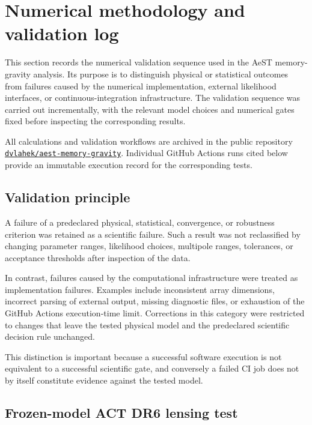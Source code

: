 \section{Numerical methodology and validation log}
\label{sec:numerical_validation_log}

This section records the numerical validation sequence used in the AeST memory-gravity analysis. Its purpose is to distinguish physical or statistical outcomes from failures caused by the numerical implementation, external likelihood interfaces, or continuous-integration infrastructure. The validation sequence was carried out incrementally, with the relevant model choices and numerical gates fixed before inspecting the corresponding results.

All calculations and validation workflows are archived in the public repository
\href{https://github.com/dvlahek/aest-memory-gravity}{\texttt{dvlahek/aest-memory-gravity}}.
Individual GitHub Actions runs cited below provide an immutable execution record for the corresponding tests.

\subsection{Validation principle}

A failure of a predeclared physical, statistical, convergence, or robustness criterion was retained as a scientific failure. Such a result was not reclassified by changing parameter ranges, likelihood choices, multipole ranges, tolerances, or acceptance thresholds after inspection of the data.

In contrast, failures caused by the computational infrastructure were treated as implementation failures. Examples include inconsistent array dimensions, incorrect parsing of external output, missing diagnostic files, or exhaustion of the GitHub Actions execution-time limit. Corrections in this category were restricted to changes that leave the tested physical model and the predeclared scientific decision rule unchanged.

This distinction is important because a successful software execution is not equivalent to a successful scientific gate, and conversely a failed CI job does not by itself constitute evidence against the tested model.

\subsection{Frozen-model ACT DR6 lensing test}
\label{sec:act_dr6_validation}

